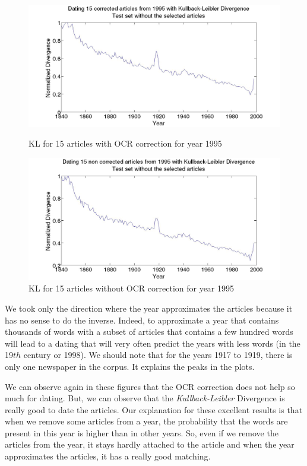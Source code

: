 \begin{figure}[H]
    \begin{minipage}[b]{0.48\linewidth}
        \includegraphics[scale=0.15]{Pictures/date_articles/kullback_leibler/15articles_1995_KL_years_simulate_articles_corrected_without_articles.jpg}
        \caption{KL for 15 articles with OCR correction for year 1995}
        \label{ArticleKL-C1995}
    \end{minipage}\hfill
    \begin{minipage}[b]{0.5\linewidth}
        \includegraphics[scale=0.15]{Pictures/date_articles/kullback_leibler/15articles_1995_KL_years_simulate_articles_without_correction_without_articles.jpg}
        \caption{KL for 15 articles without OCR correction for year 1995}
        \label{ArticleKL-N1995}
    \end{minipage}\hfill
\end{figure}

We took only the direction where the year approximates the articles because it has no sense to do the inverse. Indeed, to approximate a year that contains thousands of words with a subset of articles that contains a few hundred words will lead to a dating that will very often predict the years with less words (in the 19$th$ century or 1998). We should note that for the years 1917 to 1919, there is only one newspaper in the corpus. It explains the peaks in the plots.

We can observe again in these figures that the OCR correction does not help so much for dating. But, we can observe that the \emph{Kullback-Leibler} Divergence is really good to date the articles. Our explanation for these excellent results is that when we remove some articles from a year, the probability that the words are present in this year is higher than in other years. So, even if we remove the articles from the year, it stays hardly attached to the article and when the year approximates the articles, it has a really good matching.